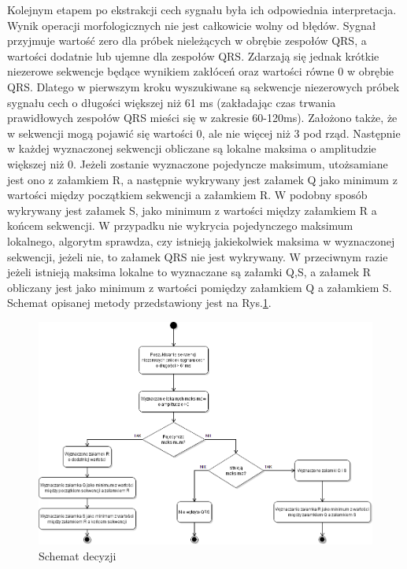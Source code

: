 \documentclass[10pt,a4paper]{article}
\begin{document}
Kolejnym etapem po ekstrakcji cech sygnału była ich odpowiednia interpretacja. Wynik operacji morfologicznych nie jest całkowicie wolny od błędów. Sygnał przyjmuje wartość zero dla próbek nieleżących w obrębie zespołów QRS, a wartości dodatnie lub ujemne dla zespołów QRS. Zdarzają się jednak krótkie niezerowe sekwencje będące wynikiem zakłóceń oraz wartości równe 0 w obrębie QRS. Dlatego w pierwszym kroku wyszukiwane są sekwencje niezerowych próbek sygnału cech o długości większej niż 61 ms (zakładając czas trwania prawidłowych zespołów QRS mieści się w zakresie 60-120ms). Założono także, że w sekwencji mogą pojawić się wartości 0, ale nie więcej niż 3 pod rząd. Następnie w każdej wyznaczonej sekwencji obliczane są lokalne maksima o amplitudzie większej niż 0. Jeżeli zostanie wyznaczone pojedyncze maksimum, utożsamiane jest ono z załamkiem R, a następnie wykrywany jest załamek Q jako minimum z wartości między początkiem sekwencji a załamkiem R. W podobny sposób wykrywany jest załamek S, jako minimum z wartości między załamkiem R a końcem sekwencji. W przypadku nie wykrycia pojedynczego maksimum lokalnego, algorytm sprawdza, czy istnieją jakiekolwiek maksima w wyznaczonej sekwencji, jeżeli nie, to załamek QRS nie jest wykrywany. W przeciwnym razie jeżeli istnieją maksima lokalne to wyznaczane są załamki Q,S, a załamek R obliczany jest jako minimum z wartości pomiędzy załamkiem Q a załamkiem S. Schemat opisanej metody przedstawiony jest na Rys.\ref{schemat_decyzji}. 

\begin{figure}
	\centerline{\includegraphics[scale=0.5]{pojedynczy_schemat_decyzji}}
	\caption{Schemat decyzji}
	\label{schemat_decyzji}
\end{figure}
\FloatBarrier
\newpage
\end{document}

